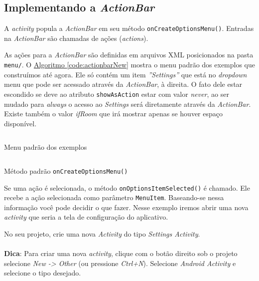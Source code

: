 \documentclass[a4paper,12pt,brazil,oneside]{book}
\begin{document}
\begin{singlespace}
	\subsection{Implementando a \emph{ActionBar}}
	
		A \emph{activity} popula a \emph{ActionBar} em seu método \texttt{onCreateOptionsMenu()}. Entradas na \emph{ActionBar} são chamadas de ações (\emph{actions}). 
		
		As ações para a \emph{ActionBar} são definidas em arquivos XML posicionados na pasta \texttt{menu/}. O \hyperref[code:actionbarNew]{Algoritmo \ref*{code:actionbarNew}} mostra o menu padrão dos exemplos que construímos até agora. Ele só contém um item \emph{''Settings''} que está no \emph{dropdown} menu que pode ser acessado através da \emph{ActionBar}, à direita. O fato dele estar escondido se deve ao atributo \texttt{showAsAction} estar com valor \emph{never}, ao ser mudado para \emph{always} o acesso ao \emph{Settings} será diretamente através da \emph{ActionBar}. Existe também o valor \emph{ifRoom} que irá mostrar apenas se houver espaço disponível.
		
		\begin{listing}[H]
		\inputminted[linenos=true,fontsize=\small,frame=lines, framesep=2mm, tabsize=2,numbersep=5pt]{xml}{src/design/actionbar-menupadrao.xml}
		\caption{Menu padrão dos exemplos}
		\end{listing}

		\begin{listing}[H]
		\inputminted[linenos=true,fontsize=\small,frame=lines, framesep=2mm, tabsize=2,numbersep=5pt]{java}{src/design/oncreateoptionsmenu-padrao.java}
		\caption{Método padrão \texttt{onCreateOptionsMenu()}}
		\label{code:actionbarNew}
		\end{listing}
		
		Se uma ação é selecionada, o método \texttt{onOptionsItemSelected()} é chamado. Ele recebe a ação selecionada como parâmetro \texttt{MenuItem}. Baseando-se nessa informação você pode decidir o que fazer. Nesse exemplo iremos abrir uma nova \emph{activity} que seria a tela de configuração do aplicativo.
		
		No seu projeto, crie uma nova \emph{Activity} do tipo \emph{Settings Activity}. 
		
		\begin{framed}
\paragraph{}\textbf{Dica}: Para criar uma nova \emph{activity}, clique com o botão direito sob o projeto selecione \emph{New -> Other} (ou pressione \emph{Ctrl+N}). Selecione \emph{Android Activity} e selecione o tipo desejado.
\textit{}
\end{framed}


\end{singlespace}
\end{document}
